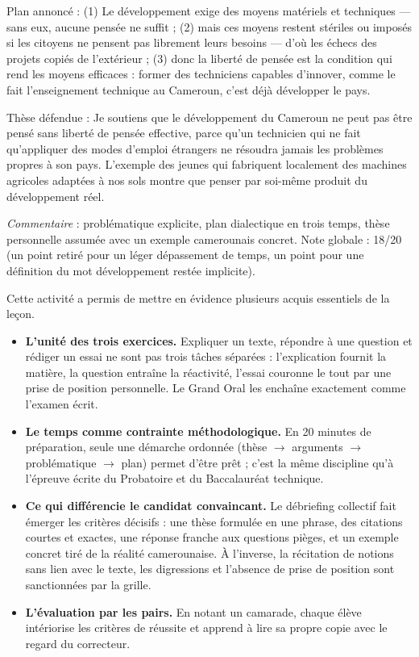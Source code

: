 \documentclass[11pt]{article}
\newcounter{popsec}
\newcounter{popsub}
\newcommand{\courssub}[1]{%
  \stepcounter{popsub}%
  \par\vspace{9pt}\noindent{\popxbold\fontsize{11.5}{13}\selectfont\color{popink}{\color{poporange}\thepopsec.\thepopsub}\hspace{6pt}#1}\par\nopagebreak\vspace{4pt}
}
\begin{document}
\begin{exoresolu}
Plan annoncé : (1) Le développement exige des moyens matériels et techniques — sans eux, aucune pensée ne suffit ; (2) mais ces moyens restent stériles ou imposés si les citoyens ne pensent pas librement leurs besoins — d'où les échecs des projets copiés de l'extérieur ; (3) donc la liberté de pensée est la condition qui rend les moyens efficaces : former des techniciens capables d'innover, comme le fait l'enseignement technique au Cameroun, c'est déjà développer le pays.

Thèse défendue : \og Je soutiens que le développement du Cameroun ne peut pas être pensé sans liberté de pensée effective, parce qu'un technicien qui ne fait qu'appliquer des modes d'emploi étrangers ne résoudra jamais les problèmes propres à son pays. L'exemple des jeunes qui fabriquent localement des machines agricoles adaptées à nos sols montre que penser par soi-même produit du développement réel. \fg

\emph{Commentaire} : problématique explicite, plan dialectique en trois temps, thèse personnelle assumée avec un exemple camerounais concret. Note globale : 18/20 (un point retiré pour un léger dépassement de temps, un point pour une définition du mot \og développement \fg restée implicite).
\end{exoresolu}

\courssub{Bilan de l'activité}

Cette activité a permis de mettre en évidence plusieurs acquis essentiels de la leçon.

\begin{itemize}
\item \textbf{L'unité des trois exercices.} Expliquer un texte, répondre à une question et rédiger un essai ne sont pas trois tâches séparées : l'explication fournit la matière, la question entraîne la réactivité, l'essai couronne le tout par une prise de position personnelle. Le Grand Oral les enchaîne exactement comme l'examen écrit.
\item \textbf{Le temps comme contrainte méthodologique.} En 20 minutes de préparation, seule une démarche ordonnée (thèse $\rightarrow$ arguments $\rightarrow$ problématique $\rightarrow$ plan) permet d'être prêt ; c'est la même discipline qu'à l'épreuve écrite du Probatoire et du Baccalauréat technique.
\item \textbf{Ce qui différencie le candidat convaincant.} Le débriefing collectif fait émerger les critères décisifs : une thèse formulée en une phrase, des citations courtes et exactes, une réponse franche aux questions pièges, et un exemple concret tiré de la réalité camerounaise. À l'inverse, la récitation de notions sans lien avec le texte, les digressions et l'absence de prise de position sont sanctionnées par la grille.
\item \textbf{L'évaluation par les pairs.} En notant un camarade, chaque élève intériorise les critères de réussite et apprend à lire sa propre copie avec le regard du correcteur.
\end{itemize}
\end{document}
